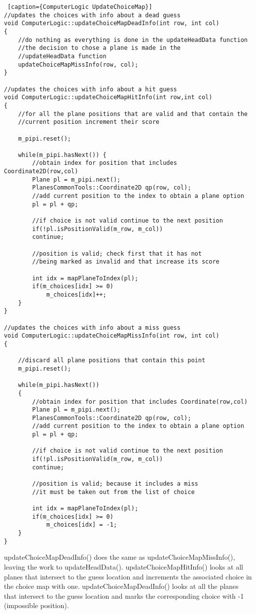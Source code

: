 \begin{lstlisting} [caption={ComputerLogic UpdateChoiceMap}]
//updates the choices with info about a dead guess
void ComputerLogic::updateChoiceMapDeadInfo(int row, int col)
{
	//do nothing as everything is done in the updateHeadData function
	//the decision to chose a plane is made in the
	//updateHeadData function
	updateChoiceMapMissInfo(row, col);
}

//updates the choices with info about a hit guess
void ComputerLogic::updateChoiceMapHitInfo(int row,int col)
{
	//for all the plane positions that are valid and that contain the
	//current position increment their score
	
	m_pipi.reset();
	
	while(m_pipi.hasNext()) {
		//obtain index for position that includes Coordinate2D(row,col)
		Plane pl = m_pipi.next();
		PlanesCommonTools::Coordinate2D qp(row, col);
		//add current position to the index to obtain a plane option
		pl = pl + qp;
		
		//if choice is not valid continue to the next position
		if(!pl.isPositionValid(m_row, m_col))
		continue;
		
		//position is valid; check first that it has not
		//being marked as invalid and that increase its score
		
		int idx = mapPlaneToIndex(pl);
		if(m_choices[idx] >= 0)
			m_choices[idx]++;
	}
}

//updates the choices with info about a miss guess
void ComputerLogic::updateChoiceMapMissInfo(int row, int col)
{

	//discard all plane positions that contain this point
	m_pipi.reset();
	
	while(m_pipi.hasNext())
	{
		//obtain index for position that includes Coordinate(row,col)
		Plane pl = m_pipi.next();
		PlanesCommonTools::Coordinate2D qp(row, col);
		//add current position to the index to obtain a plane option
		pl = pl + qp;
		
		//if choice is not valid continue to the next position
		if(!pl.isPositionValid(m_row, m_col))
		continue;
		
		//position is valid; because it includes a miss
		//it must be taken out from the list of choice
		
		int idx = mapPlaneToIndex(pl);
		if(m_choices[idx] >= 0)
			m_choices[idx] = -1;
	}
}
\end{lstlisting}

updateChoiceMapDeadInfo() does the same as updateChoiceMapMissInfo(), leaving the work to updateHeadData(). updateChoiceMapHitInfo() looks at all planes that intersect to the guess location and increments the associated choice in the choice map with one. updateChoiceMapDeadInfo() looks at all the planes that intersect to the guess location and marks the corresponding choice with -1 (impossible position).

